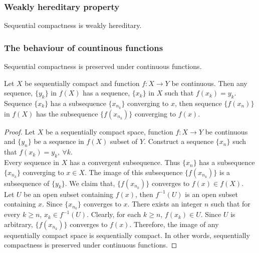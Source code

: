 \subsubsection{Weakly hereditary property}
\begin{theorem}
	Sequential compactness is weakly hereditary.
	\cite[Exercises 11.1.3]{joshi}
\end{theorem}

\subsubsection{The behaviour of countinous functions}
\begin{theorem}
	Sequential compactness is preserved under continuous functions.
	\cite[Exercises 11.1.4]{joshi}
\end{theorem}
\begin{synopsis}
	Let $X$ be sequentially compact and function $f : X \to Y$ be continuous.
	Then any sequence, $\{y_k\}$ in $f(X)$ has a sequence, $\{x_k\}$ in $X$ such that $f(x_k) = y_k$.
	Sequence $\{x_k\}$ has a subsequence $\{x_{n_k}\}$ converging to $x$, then sequence $\{ f(x_n)\}$ in $f(X)$ has the subsequence $\{f(x_{n_k})\}$ converging to $f(x)$.
\end{synopsis}
\begin{proof}
	Let $X$ be a sequentially compact space, function $f: X \to Y$ be continuous and $\{y_n\}$ be a sequence in $f(X)$ subset of $Y$.
	Construct a sequence $\{x_n\}$ such that $f(x_k) = y_k,\ \forall k$.\\

	
	Every sequence in $X$ has a convergent subsequence.
	Thus $\{x_n\}$ has a subsequence $\{x_{n_k}\}$ converging to $x \in X$.
	The image of this subsequence $\{f(x_{n_k})\}$ is a subsequence of $\{y_k\}$.
	We claim that, $\{f(x_{n_k})\}$ converges to $f(x) \in f(X)$.\\


	Let $U$ be an open subset containing $f(x)$, then $f^{-1}(U)$ is an open subset containing $x$.
	Since $\{x_{n_k}\}$ converges to $x$.
	There exists an integer $n$ such that for every $k \ge n$, $x_k \in f^{-1}(U)$.
	Clearly, for each $k \ge n$, $f(x_k) \in U$.
	Since $U$ is arbitrary, $\{ f(x_{n_k})\}$ converges to $f(x)$. Therefore, the image of any sequentially compact space is sequentially compact.
	In other words, sequentially compactness is preserved under continuous functions.
\end{proof}

